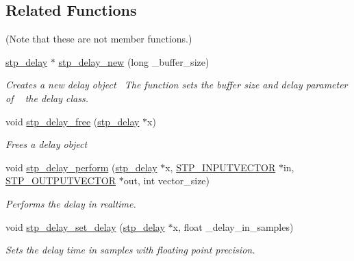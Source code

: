 \subsection*{Related Functions}
(Note that these are not member functions.) \begin{DoxyCompactItemize}
\item 
\hyperlink{structstp__delay}{stp\+\_\+delay} $\ast$ \hyperlink{structstp__delay_a3a73c0ad8f9e2b75658e2caa0f953be5}{stp\+\_\+delay\+\_\+new} (long \+\_\+buffer\+\_\+size)
\begin{DoxyCompactList}\small\item\em Creates a new delay object~\newline
 The function sets the buffer size and delay parameter of ~\newline
 the delay class. \end{DoxyCompactList}\item 
void \hyperlink{structstp__delay_a59f19a499544509b42b44a66bb3cc4da}{stp\+\_\+delay\+\_\+free} (\hyperlink{structstp__delay}{stp\+\_\+delay} $\ast$x)
\begin{DoxyCompactList}\small\item\em Frees a delay object~\newline
 \end{DoxyCompactList}\item 
void \hyperlink{structstp__delay_a205e835f977cc00c091e448946719ef9}{stp\+\_\+delay\+\_\+perform} (\hyperlink{structstp__delay}{stp\+\_\+delay} $\ast$x, \hyperlink{stp__defines_8h_a142134bffa517ce86ebf0bdcdbe975d2}{S\+T\+P\+\_\+\+I\+N\+P\+U\+T\+V\+E\+C\+T\+OR} $\ast$in, \hyperlink{stp__defines_8h_a0a4fde8c3943f5267ab6f09538b3ac26}{S\+T\+P\+\_\+\+O\+U\+T\+P\+U\+T\+V\+E\+C\+T\+OR} $\ast$out, int vector\+\_\+size)
\begin{DoxyCompactList}\small\item\em Performs the delay in realtime. ~\newline
 \end{DoxyCompactList}\item 
void \hyperlink{structstp__delay_a0c9d0cc22a2fa7c0efed1d2eceafe9b9}{stp\+\_\+delay\+\_\+set\+\_\+delay} (\hyperlink{structstp__delay}{stp\+\_\+delay} $\ast$x, float \+\_\+delay\+\_\+in\+\_\+samples)
\begin{DoxyCompactList}\small\item\em Sets the delay time in samples with floating point precision. ~\newline
 \end{DoxyCompactList}\item 

\end{DoxyCompactItemize}
